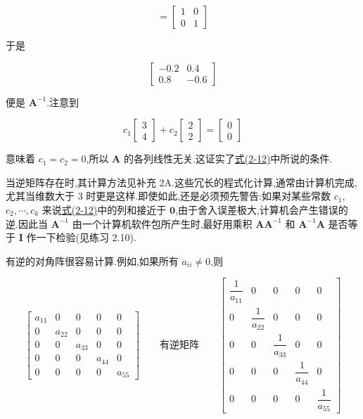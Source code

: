 \[
= \begin{bmatrix} 1 & 0 \\ 0 & 1 \end{bmatrix}
\]

于是

\[
\begin{bmatrix} -0.2 & 0.4 \\ 0.8 & -0.6 \end{bmatrix}
\]

便是 $\bm{A}^{-1}$.注意到

\[
c_1\begin{bmatrix} 3 \\ 4 \end{bmatrix} + c_2\begin{bmatrix} 2 \\ 2 \end{bmatrix} = \begin{bmatrix} 0 \\ 0 \end{bmatrix}
\]

意味着 $c_1 = c_2 = 0$,所以 $\bm{A}$ 的各列线性无关.这证实了\hyperref[eq:2-12]{式(2-12)}中所说的条件.

当逆矩阵存在时,其计算方法见补充 2A.这些冗长的程式化计算,通常由计算机完成,尤其当维数大于 3 时更是这样.即使如此,还是必须预先警告:如果对某些常数 $c_1$, $c_2, \cdots, c_k$ 来说\hyperref[eq:2-12]{式(2-12)}中的列和接近于 $\bm{0}$,由于舍入误差极大,计算机会产生错误的逆.因此当 $\bm{A}^{-1}$ 由一个计算机软件包所产生时,最好用乘积 $\bm{A}\bm{A}^{-1}$ 和 $\bm{A}^{-1}\bm{A}$ 是否等于 $\bm{I}$ 作一下检验(见练习 2.10).

有逆的对角阵很容易计算.例如,如果所有 $a_{ii} \neq 0$,则

\[
\begin{bmatrix}
a_{11} & 0 & 0 & 0 & 0 \\
0 & a_{22} & 0 & 0 & 0 \\
0 & 0 & a_{33} & 0 & 0 \\
0 & 0 & 0 & a_{44} & 0 \\
0 & 0 & 0 & 0 & a_{55}
\end{bmatrix}
\qquad \text{有逆矩阵} \qquad
\begin{bmatrix}
\dfrac{1}{a_{11}} & 0 & 0 & 0 & 0 \\[2mm]
0 & \dfrac{1}{a_{22}} & 0 & 0 & 0 \\[2mm]
0 & 0 & \dfrac{1}{a_{33}} & 0 & 0 \\[2mm]
0 & 0 & 0 & \dfrac{1}{a_{44}} & 0 \\[2mm]
0 & 0 & 0 & 0 & \dfrac{1}{a_{55}}
\end{bmatrix}
\]

